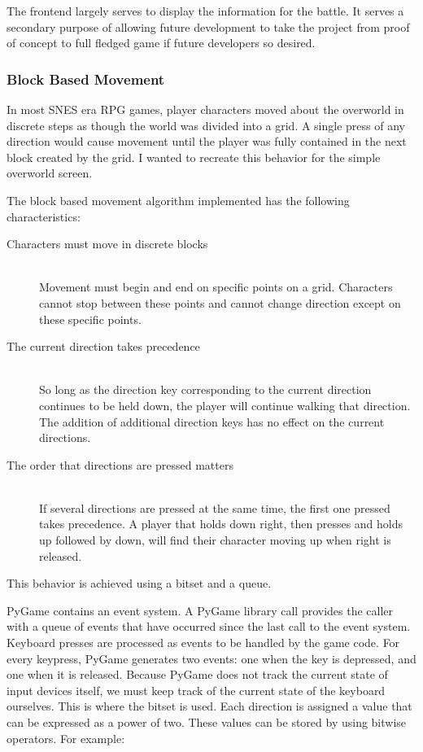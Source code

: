 \documentclass[11pt]{article}
\begin{document}
The frontend largely serves to display the information for the battle.  It serves a secondary purpose of allowing future development to take the project from proof of concept to full fledged game if future developers so desired.

\subsubsection{Block Based Movement}

In most SNES era RPG games, player characters moved about the overworld in discrete steps as though the world was divided into a grid.  A single press of any direction would cause movement until the player was fully contained in the next block created by the grid.  I wanted to recreate this behavior for the simple overworld screen.

The block based movement algorithm implemented has the following characteristics:
\begin{description}
   \item[Characters must move in discrete blocks] \hfill \\
   Movement must begin and end on specific points on a grid.  Characters cannot stop between these points and cannot change direction except on these specific points. 
   \item[The current direction takes precedence] \hfill \\
   So long as the direction key corresponding to the current direction continues to be held down, the player will continue walking that direction.  The addition of additional direction keys has no effect on the current directions.
   \item[The order that directions are pressed matters] \hfill \\
   If several directions are pressed at the same time, the first one pressed takes precedence.  A player that holds down right, then presses and holds up followed by down, will find their character moving up when right is released.
\end{description}

This behavior is achieved using a bitset and a queue.  

PyGame contains an event system.  A PyGame library call provides the caller with a queue of events that have occurred since the last call to the event system.  Keyboard presses are processed as events to be handled by the game code.  For every keypress, PyGame generates two events: one when the key is depressed, and one when it is released.  Because PyGame does not track the current state of input devices itself, we must keep track of the current state of the keyboard ourselves.  This is where the bitset is used.  Each direction is assigned a value that can be expressed as a power of two. These values can be stored by using bitwise operators.  For example:
\end{document}
